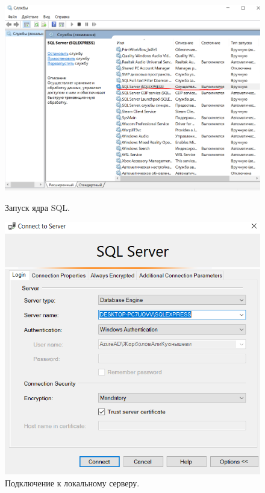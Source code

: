 \begin{figure}[h!]
    \centering
    \begin{minipage}[p]{0.45\linewidth}
            \centering
            \includegraphics[width=1\linewidth]{Pic/lab1/SQLServer.PNG}
            \caption{Запуск ядра SQL.}
            \label{fig:SQLServer}
    \end{minipage}
    \hfill
    \begin{minipage}[p]{0.45\linewidth}
            \centering
            \includegraphics[width=0.8\linewidth]{Pic/lab1/SQLServerConnect.PNG}
            \caption{Подключение к локальному серверу.}
            \label{fig:Connect}
    \end{minipage}
    
\end{figure}

